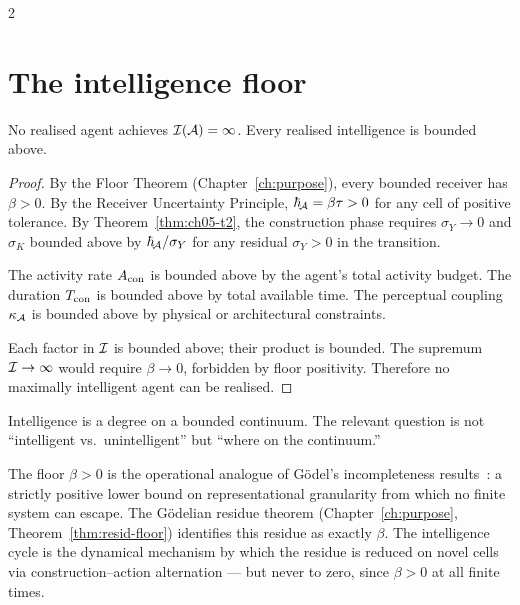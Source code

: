 \begin{multicols}{2}
\section{The intelligence floor}
\label{sec:ch05-floor}

\begin{theorem}\label{thm:ch05-t6}
No realised agent achieves $\mathcal{I}(\mathcal{A}) = \infty$. Every realised intelligence is
bounded above.
\end{theorem}

\begin{proof}
By the Floor Theorem (Chapter~\ref{ch:purpose}), every bounded receiver has $\beta > 0$.
By the Receiver Uncertainty Principle, $\hbar_{\!\mathcal{A}} = \beta\tau > 0$ for any cell of positive
tolerance. By Theorem~\ref{thm:ch05-t2}, the construction phase requires $\sigma_Y \to 0$
and $\sigma_K$ bounded above by $\hbar_{\!\mathcal{A}}/\sigma_Y$ for any residual $\sigma_Y > 0$ in
the transition.

The activity rate $A_{\mathrm{con}}$ is bounded above by the agent's total activity budget. The
duration $T_{\mathrm{con}}$ is bounded above by total available time. The perceptual coupling
$\kappa_{\mathcal{A}}$ is bounded above by physical or architectural constraints.

Each factor in $\mathcal{I}$ is bounded above; their product is bounded. The supremum
$\mathcal{I} \to \infty$ would require $\beta \to 0$, forbidden by floor positivity.
Therefore no maximally intelligent agent can be realised.
\end{proof}

\begin{corollary}\label{cor:ch05-degree}
Intelligence is a degree on a bounded continuum. The relevant question is not
``intelligent vs.\ unintelligent'' but ``where on the continuum.''
\end{corollary}

\begin{remark}
The floor $\beta > 0$ is the operational analogue of G\"{o}del's incompleteness
results~\citep{godel1931,tarski1933}: a strictly positive lower bound on representational
granularity from which no finite system can escape. The G\"{o}delian residue theorem
(Chapter~\ref{ch:purpose}, Theorem~\ref{thm:resid-floor}) identifies this residue as
exactly $\beta$. The intelligence cycle is the dynamical mechanism by which the residue
is reduced on novel cells via construction--action alternation --- but never to zero,
since $\beta > 0$ at all finite times.
\end{remark}

\end{multicols}

